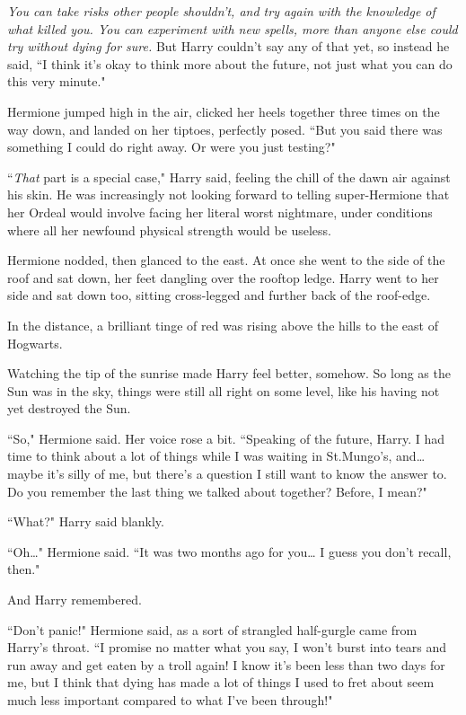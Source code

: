 \emph{You can take risks other people shouldn't, and try again with the knowledge of what killed you. You can experiment with new spells, more than anyone else could try without dying for sure.} But Harry couldn't say any of that yet, so instead he said, ``I think it's okay to think more about the future, not just what you can do this very minute."

Hermione jumped high in the air, clicked her heels together three times on the way down, and landed on her tiptoes, perfectly posed. ``But you said there was something I could do right away. Or were you just testing?"

``\emph{That} part is a special case," Harry said, feeling the chill of the dawn air against his skin. He was increasingly not looking forward to telling super-Hermione that her Ordeal would involve facing her literal worst nightmare, under conditions where all her newfound physical strength would be useless.

Hermione nodded, then glanced to the east. At once she went to the side of the roof and sat down, her feet dangling over the rooftop ledge. Harry went to her side and sat down too, sitting cross-legged and further back of the roof-edge.

In the distance, a brilliant tinge of red was rising above the hills to the east of Hogwarts.

Watching the tip of the sunrise made Harry feel better, somehow. So long as the Sun was in the sky, things were still all right on some level, like his having not yet destroyed the Sun.

``So," Hermione said. Her voice rose a bit. ``Speaking of the future, Harry. I had time to think about a lot of things while I was waiting in St.\?Mungo's, and{\ldots} maybe it's silly of me, but there's a question I still want to know the answer to. Do you remember the last thing we talked about together? Before, I mean?"

``What?" Harry said blankly.

``Oh{\ldots}" Hermione said. ``It was two months ago for you{\ldots} I guess you don't recall, then."

And Harry remembered.

``Don't panic!" Hermione said, as a sort of strangled half-gurgle came from Harry's throat. ``I promise no matter what you say, I won't burst into tears and run away and get eaten by a troll again! I know it's been less than two days for me, but I think that dying has made a lot of things I used to fret about seem much less important compared to what I've been through!"

